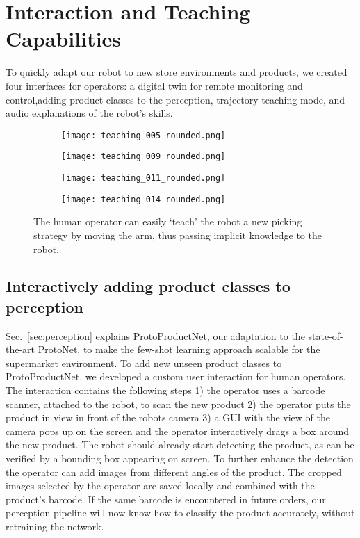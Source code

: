 \section{Interaction and Teaching Capabilities}
\label{sec:teaching}

To quickly adapt our robot to new store environments and products, we created four interfaces for operators: a digital twin for remote monitoring and control,adding product classes to the perception, trajectory teaching mode, and audio explanations of the robot's skills. 


\begin{figure}[t]
  \centering
  \begin{subfigure}[b]{0.45\linewidth}
    \centering
    \texttt{[image: teaching\_005\_rounded.png]}
    \caption{}
    \label{subfig:teaching_1}
  \end{subfigure}
  \begin{subfigure}[b]{0.45\linewidth}
    \centering
    \texttt{[image: teaching\_009\_rounded.png]}
    \caption{}
    \label{subfig:teaching_2}
  \end{subfigure}
  \begin{subfigure}[b]{0.45\linewidth}
    \centering
    \texttt{[image: teaching\_011\_rounded.png]}
    \caption{}
    \label{subfig:teaching_3}
  \end{subfigure}
  \begin{subfigure}[b]{0.45\linewidth}
    \centering
    \texttt{[image: teaching\_014\_rounded.png]}
    \caption{}
    \label{subfig:teaching_4}
  \end{subfigure}
  \caption{The human operator can easily `teach' the robot a new picking
  strategy by moving the arm, thus passing implicit knowledge to the
  robot.}
  \label{fig:recording}
\end{figure}
\subsection{Interactively adding product classes to perception}
Sec.~\ref{sec:perception} explains ProtoProductNet, our adaptation to the state-of-the-art ProtoNet, to make the few-shot learning approach scalable for the supermarket environment. To add new unseen product classes to ProtoProductNet, we developed a custom user interaction for human operators. The interaction contains the following steps 1) the operator uses a barcode scanner, attached to the robot, to scan the new product 2) the operator puts the product in view in front of the robots camera 3) a GUI with the view of the camera pops up on the screen and the operator interactively drags a box around the new product. The robot should already start detecting the product, as can be verified by a bounding box appearing on screen. To further enhance the detection the operator can add images from different angles of the product. The cropped images selected by the operator are saved locally and combined with the product's barcode. If the same barcode is encountered in future orders, our perception pipeline will now know how to classify the product accurately, without retraining the network.

